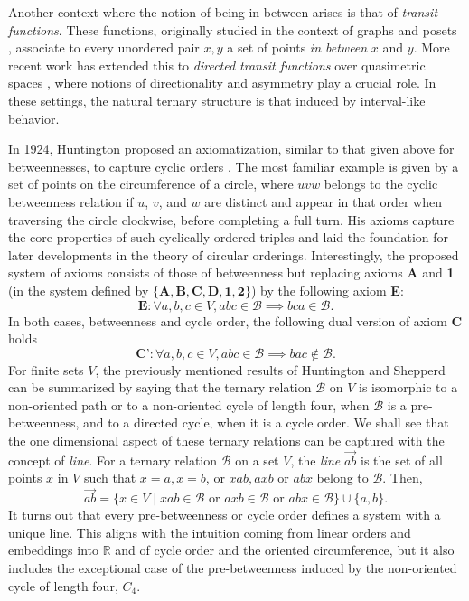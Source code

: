 \documentclass{article}
\newcommand{\calb}{\mathcal{B}}
\begin{document}
Another context where the notion of being in between arises is that of \emph{transit functions}. These functions, originally studied in the context of graphs and posets \cite{mulder2007transit}, associate to every unordered pair ${x,y}$ a set of points \textit{in between} $x$ and $y$. More recent work has extended this to \emph{directed transit functions} over quasimetric spaces \cite{anil2025directed}, where notions of directionality and asymmetry play a crucial role. In these settings, the natural ternary structure is that induced by interval-like behavior.

In 1924, Huntington proposed an axiomatization, similar to that given above for betweennesses, to capture cyclic orders \cite{huntington1924sets}. The most familiar example is given by a set of points on the circumference of a circle, where $uvw$ belongs to the cyclic betweenness relation if $u$, $v$, and $w$ are distinct and appear in that order when traversing the circle clockwise, before completing a full turn. 
His axioms capture the core properties of such cyclically ordered triples and laid the foundation for later developments in the theory of circular orderings.
Interestingly, the proposed system of axioms consists of those of betweenness but replacing axioms \textbf{A} and \textbf{1} (in the system defined by $\{\textbf{A}, \textbf{B}, \textbf{C},\textbf{D},\textbf{1},\textbf{2}\}$) by the following axiom \textbf{E}:
$$\textbf{E}: \forall a,b,c\in V, abc\in\calb\implies bca\in\calb.$$
In both cases, betweenness and cycle order, the following dual version of axiom \textbf{C} holds 
$$\textbf{C'}: \forall a,b,c\in V, abc\in \calb \implies bac\notin \calb.$$
For finite sets $V$, the previously mentioned results of Huntington and Shepperd can be summarized by saying that the ternary relation $\calb$ on $V$ is  isomorphic to a non-oriented path or to a non-oriented cycle of length four, when $\calb$ is a pre-betweenness, and to a  directed cycle, when it is a cycle order. We shall see that the one dimensional aspect of these ternary relations can be captured with the concept of \emph{line}. For a ternary relation $\calb$ on a set $V$, the \textit{line} $\overrightarrow{ab}$ is the set of all points $x$ in $V$ such that $x=a, x=b$, or $xab, axb$ or $abx$ belong to $\calb$. Then, \[
\overrightarrow{ab} = \{ x \in V \mid xab \in\calb\text{ or } axb\in\calb\text{ or } abx \in\calb\}\cup \{a,b\}.
\]
It turns out that every pre-betweenness or cycle order defines a system with a unique line. This aligns with the intuition coming from linear orders and embeddings into $\mathbb{R}$ and of cycle order and the oriented circumference, but it also includes the exceptional case of the pre-betweenness induced by the non-oriented cycle of length four, $C_4$.
\end{document}
